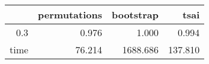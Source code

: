 \begin{table}[ht]
\centering
\begingroup\tiny
\begin{tabular}{rrrr}
  \hline
 & permutations & bootstrap & tsai \\ 
  \hline
0.3 & 0.976 & 1.000 & 0.994 \\ 
  time & 76.214 & 1688.686 & 137.810 \\ 
   \hline
\end{tabular}
\endgroup
\end{table}
